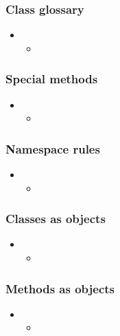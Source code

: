 \begin{frame}[fragile]
%
  \frametitle{Class glossary}
%
  \begin{itemize}
%
  \item 
    \begin{itemize}
    \item
    \end{itemize}
%
  \end{itemize}
%
\end{frame}

\begin{frame}[fragile]
%
  \frametitle{Special methods}
%
  \begin{itemize}
%
  \item 
    \begin{itemize}
    \item
    \end{itemize}
%
  \end{itemize}
%
\end{frame}

\begin{frame}[fragile]
%
  \frametitle{Namespace rules}
%
  \begin{itemize}
%
  \item 
    \begin{itemize}
    \item
    \end{itemize}
%
  \end{itemize}
%
\end{frame}

\begin{frame}[fragile]
%
  \frametitle{Classes as objects}
%
  \begin{itemize}
%
  \item 
    \begin{itemize}
    \item
    \end{itemize}
%
  \end{itemize}
%
\end{frame}

\begin{frame}[fragile]
%
  \frametitle{Methods as objects}
%
  \begin{itemize}
%
  \item 
    \begin{itemize}
    \item
    \end{itemize}
%
  \end{itemize}
%
\end{frame}

